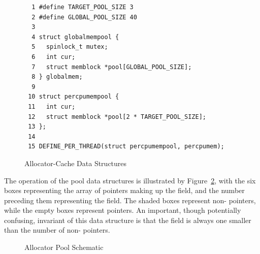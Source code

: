\begin{figure}[htbp]
{ \scriptsize
\begin{verbatim}
  1 #define TARGET_POOL_SIZE 3
  2 #define GLOBAL_POOL_SIZE 40
  3
  4 struct globalmempool {
  5   spinlock_t mutex;
  6   int cur;
  7   struct memblock *pool[GLOBAL_POOL_SIZE];
  8 } globalmem;
  9
 10 struct percpumempool {
 11   int cur;
 12   struct memblock *pool[2 * TARGET_POOL_SIZE];
 13 };
 14
 15 DEFINE_PER_THREAD(struct percpumempool, percpumem);
\end{verbatim}
}
\caption{Allocator-Cache Data Structures}
\label{fig:SMPdesign:Allocator-Cache Data Structures}
\end{figure}

The operation of the pool data structures is illustrated by
Figure~\ref{fig:SMPdesign:Allocator Pool Schematic},
with the six boxes representing the array of pointers making up
the  field, and the number preceding them representing
the  field.
The shaded boxes represent non- pointers, while the empty
boxes represent  pointers.
An important, though potentially confusing, invariant of this
data structure is that the  field is always one
smaller than the number of non- pointers.

\begin{figure}[htb]
\begin{center}
\end{center}
\caption{Allocator Pool Schematic}
\label{fig:SMPdesign:Allocator Pool Schematic}
\end{figure}

